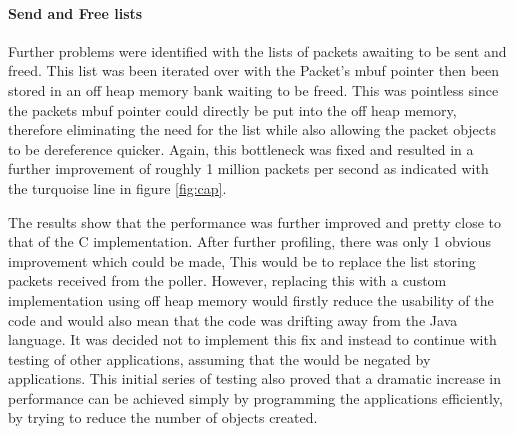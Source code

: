 \documentclass[final_report.tex]{subfiles}
\begin{document}
\paragraph*{Send and Free lists} Further problems were identified with the lists of packets awaiting to be sent and freed. This list was been iterated over with the Packet's mbuf pointer then been stored in an off heap memory bank waiting to be freed. This was pointless since the packets mbuf pointer could directly be put into the off heap memory, therefore eliminating the need for the list while also allowing the packet objects to be dereference quicker. Again, this bottleneck was fixed and resulted in a further improvement of roughly 1 million packets per second as indicated with the turquoise line in figure \ref{fig:cap}.

The results show that the performance was further improved and pretty close to that of the C implementation. After further profiling, there was only 1 obvious improvement which could be made, This would be to replace the list storing packets received from the poller. However, replacing this with a custom implementation using off heap memory would firstly reduce the usability of the code and would also mean that the code was drifting away from the Java language. It was decided not to implement this fix and instead to continue with testing of other applications, assuming that the would be negated by applications. This initial series of testing also proved that a dramatic increase in performance can be achieved simply by programming the applications efficiently, by trying to reduce the number of objects created.
\end{document}
